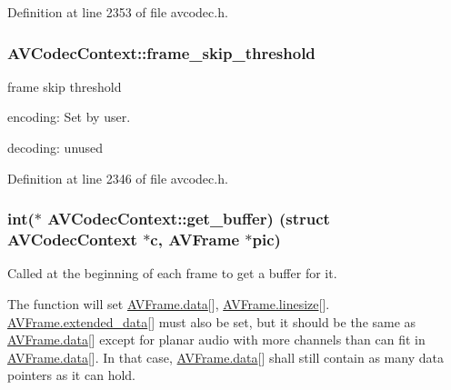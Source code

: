 Definition at line 2353 of file avcodec.\+h.

\subsubsection[{\texorpdfstring{frame\+\_\+skip\+\_\+threshold}{frame_skip_threshold}}]{ A\+V\+Codec\+Context\+::frame\+\_\+skip\+\_\+threshold}\hypertarget{struct_a_v_codec_context_a3dde2cdd14c9456ab2490e5c4d0ebf3b}{}\label{struct_a_v_codec_context_a3dde2cdd14c9456ab2490e5c4d0ebf3b}
frame skip threshold
\begin{DoxyItemize}
\item encoding\+: Set by user.
\item decoding\+: unused 
\end{DoxyItemize}

Definition at line 2346 of file avcodec.\+h.

\subsubsection[{\texorpdfstring{get\+\_\+buffer}{get_buffer}}]{ {\bf int}($\ast$ A\+V\+Codec\+Context\+::get\+\_\+buffer) (struct {\bf A\+V\+Codec\+Context} $\ast${\bf c}, {\bf A\+V\+Frame} $\ast$pic)}\hypertarget{struct_a_v_codec_context_abc3a806b73306162efa218510448d54f}{}\label{struct_a_v_codec_context_abc3a806b73306162efa218510448d54f}
Called at the beginning of each frame to get a buffer for it.

The function will set \hyperlink{struct_a_v_frame_a1d0f65014a8d1bf78cec8cbed2304992}{A\+V\+Frame.\+data}\mbox{[}\mbox{]}, \hyperlink{struct_a_v_frame_aa52bfc6605f6a3059a0c3226cc0f6567}{A\+V\+Frame.\+linesize}\mbox{[}\mbox{]}. \hyperlink{struct_a_v_frame_afca04d808393822625e09b5ba91c6756}{A\+V\+Frame.\+extended\+\_\+data}\mbox{[}\mbox{]} must also be set, but it should be the same as \hyperlink{struct_a_v_frame_a1d0f65014a8d1bf78cec8cbed2304992}{A\+V\+Frame.\+data}\mbox{[}\mbox{]} except for planar audio with more channels than can fit in \hyperlink{struct_a_v_frame_a1d0f65014a8d1bf78cec8cbed2304992}{A\+V\+Frame.\+data}\mbox{[}\mbox{]}. In that case, \hyperlink{struct_a_v_frame_a1d0f65014a8d1bf78cec8cbed2304992}{A\+V\+Frame.\+data}\mbox{[}\mbox{]} shall still contain as many data pointers as it can hold.

